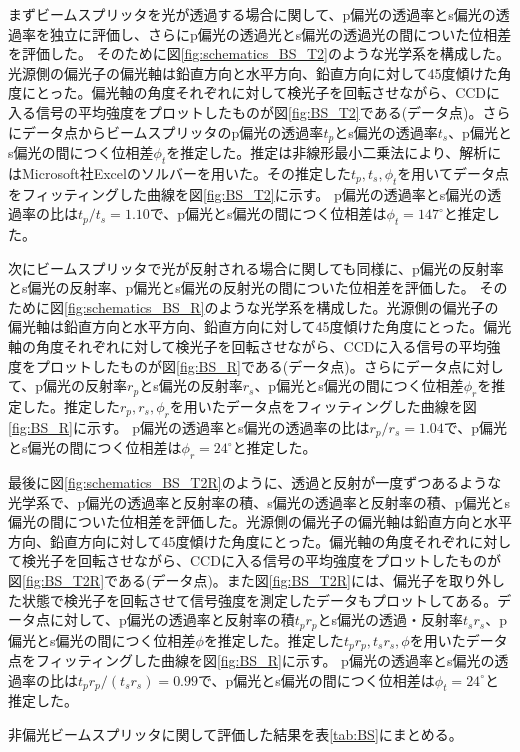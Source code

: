 \documentclass[11pt,a4paper]{jsarticle}
\begin{document}
まずビームスプリッタを光が透過する場合に関して、p偏光の透過率とs偏光の透過率を独立に評価し、さらにp偏光の透過光とs偏光の透過光の間についた位相差を評価した。
そのために図\ref{fig:schematics_BS_T2}のような光学系を構成した。光源側の偏光子の偏光軸は鉛直方向と水平方向、鉛直方向に対して45度傾けた角度にとった。偏光軸の角度それぞれに対して検光子を回転させながら、CCDに入る信号の平均強度をプロットしたものが図\ref{fig:BS_T2}である(データ点)。さらにデータ点からビームスプリッタのp偏光の透過率$t_p$とs偏光の透過率$t_s$、p偏光とs偏光の間につく位相差$\phi_t$を推定した。推定は非線形最小二乗法により、解析にはMicrosoft社Excelのソルバーを用いた。その推定した$t_p,t_s,\phi_t$を用いてデータ点をフィッティングした曲線を図\ref{fig:BS_T2}に示す。
p偏光の透過率とs偏光の透過率の比は$t_p/t_s=1.10$で、p偏光とs偏光の間につく位相差は$\phi_t=147^\circ$と推定した。

次にビームスプリッタで光が反射される場合に関しても同様に、p偏光の反射率とs偏光の反射率、p偏光とs偏光の反射光の間についた位相差を評価した。
そのために図\ref{fig:schematics_BS_R}のような光学系を構成した。光源側の偏光子の偏光軸は鉛直方向と水平方向、鉛直方向に対して45度傾けた角度にとった。偏光軸の角度それぞれに対して検光子を回転させながら、CCDに入る信号の平均強度をプロットしたものが図\ref{fig:BS_R}である(データ点)。さらにデータ点に対して、p偏光の反射率$r_p$とs偏光の反射率$r_s$、p偏光とs偏光の間につく位相差$\phi_r$を推定した。推定した$r_p,r_s,\phi_r$を用いたデータ点をフィッティングした曲線を図\ref{fig:BS_R}に示す。
p偏光の透過率とs偏光の透過率の比は$r_p/r_s=1.04$で、p偏光とs偏光の間につく位相差は$\phi_r=24^\circ$と推定した。

最後に図\ref{fig:schematics_BS_T2R}のように、透過と反射が一度ずつあるような光学系で、p偏光の透過率と反射率の積、s偏光の透過率と反射率の積、p偏光とs偏光の間についた位相差を評価した。光源側の偏光子の偏光軸は鉛直方向と水平方向、鉛直方向に対して45度傾けた角度にとった。偏光軸の角度それぞれに対して検光子を回転させながら、CCDに入る信号の平均強度をプロットしたものが図\ref{fig:BS_T2R}である(データ点)。また図\ref{fig:BS_T2R}には、偏光子を取り外した状態で検光子を回転させて信号強度を測定したデータもプロットしてある。データ点に対して、p偏光の透過率と反射率の積$t_pr_p$とs偏光の透過・反射率$t_sr_s$、p偏光とs偏光の間につく位相差$\phi$を推定した。推定した$t_pr_p,t_sr_s,\phi$を用いたデータ点をフィッティングした曲線を図\ref{fig:BS_R}に示す。
p偏光の透過率とs偏光の透過率の比は$t_pr_p/(t_sr_s)=0.99$で、p偏光とs偏光の間につく位相差は$\phi_t=24^\circ$と推定した。

非偏光ビームスプリッタに関して評価した結果を表\ref{tab:BS}にまとめる。
\end{document}
